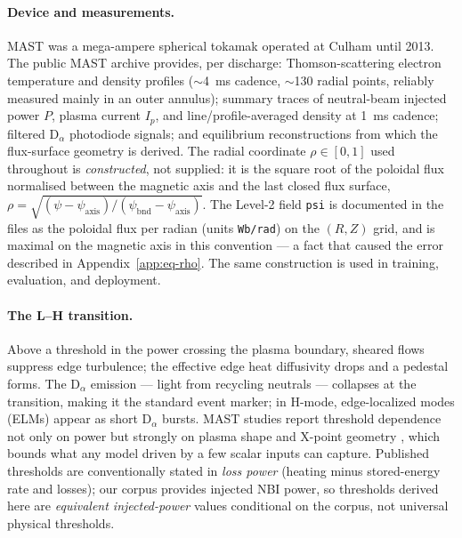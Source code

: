 \documentclass[11pt]{article}
\begin{document}
\paragraph{Device and measurements.} MAST was a mega-ampere spherical
tokamak operated at Culham until 2013. The public MAST archive
\citep{mastopendata} provides, per discharge: Thomson-scattering electron
temperature and density profiles ($\sim$\SI{4}{ms} cadence, $\sim$130
radial points, reliably measured mainly in an outer annulus); summary
traces of neutral-beam injected power $P$, plasma current $I_p$, and
line/profile-averaged density at \SI{1}{ms} cadence; filtered D$_\alpha$
photodiode signals; and equilibrium reconstructions from which the
flux-surface geometry is derived. The radial coordinate $\rho \in [0,1]$ used throughout is
\emph{constructed}, not supplied: it is the square root of the poloidal
flux normalised between the magnetic axis and the last closed flux surface,
$\rho = \sqrt{(\psi - \psi_{\mathrm{axis}})/(\psi_{\mathrm{bnd}} -
\psi_{\mathrm{axis}})}$. The Level-2 field \texttt{psi} is documented in
the files as the poloidal flux per radian (units \texttt{Wb/rad}) on the
$(R, Z)$ grid, and is maximal on the magnetic axis in this convention ---
a fact that caused the error described in Appendix~\ref{app:eq-rho}. The
same construction is used in training, evaluation, and deployment.

\paragraph{The L--H transition.} Above a threshold in the power crossing
the plasma boundary, sheared flows suppress edge turbulence; the effective
edge heat diffusivity drops and a pedestal forms. The D$_\alpha$ emission
--- light from recycling neutrals --- collapses at the transition, making
it the standard event marker; in H-mode, edge-localized modes (ELMs)
appear as short D$_\alpha$ bursts. MAST studies report threshold
dependence not only on power but strongly on plasma shape and X-point
geometry \citep{meyer2011}, which bounds what any model driven by a few
scalar inputs can capture. Published thresholds are conventionally stated
in \emph{loss power} (heating minus stored-energy rate and losses); our
corpus provides injected NBI power, so thresholds derived here are
\emph{equivalent injected-power} values conditional on the corpus, not
universal physical thresholds.
\end{document}
